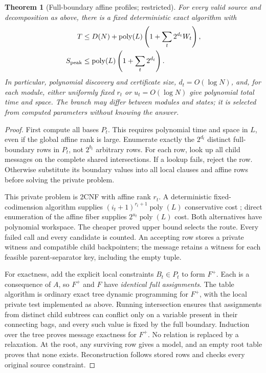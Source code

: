\documentclass[11pt]{article}
\newtheorem{theorem}{Theorem}
\newcommand{\poly}{\operatorname{poly}}
\begin{document}
\begin{theorem}[Full-boundary affine profiles; restricted]
For every valid source and decomposition as above, there is a fixed deterministic exact algorithm with
\begin{align*}
 T&\le D(N)+\poly(L)\left(1+\sum_t2^{d_t}W_t\right),\\
 S_{\rm peak}&\le\poly(L)\left(1+\sum_t2^{d_t}\right).
\end{align*}
In particular, polynomial discovery and certificate size, $d_t=O(\log N)$, and, for each module, either uniformly fixed $r_t$ or $u_t=O(\log N)$ give polynomial total time and space. The branch may differ between modules and states; it is selected from computed parameters without knowing the answer.
\end{theorem}
\begin{proof}
First compute all bases $P_t$. This requires polynomial time and space in $L$, even if the global affine rank is large. Enumerate exactly the $2^{d_t}$ distinct full-boundary rows in $P_t$, not $2^{b_t}$ arbitrary rows. For each row, look up all child messages on the complete shared intersections. If a lookup fails, reject the row. Otherwise substitute its boundary values into all local clauses and affine rows before solving the private problem.

This private problem is 2CNF with affine rank $r_t$. A deterministic fixed-codimension algorithm supplies $(i_t+1)^{r_t+1}\poly(L)$ conservative cost \cite{AG2021}; direct enumeration of the affine fiber supplies $2^{u_t}\poly(L)$ cost. Both alternatives have polynomial workspace. The cheaper proved upper bound selects the route. Every failed call and every candidate is counted. An accepting row stores a private witness and compatible child backpointers; the message retains a witness for each feasible parent-separator key, including the empty tuple.

For exactness, add the explicit local constraints $B_t\in P_t$ to form $F^+$. Each is a consequence of $A$, so $F^+$ and $F$ have \emph{identical full assignments}. The table algorithm is ordinary exact tree dynamic programming for $F^+$, with the local private test implemented as above. Running intersection ensures that assignments from distinct child subtrees can conflict only on a variable present in their connecting bags, and every such value is fixed by the full boundary. Induction over the tree proves message exactness for $F^+$. No relation is replaced by a relaxation. At the root, any surviving row gives a model, and an empty root table proves that none exists. Reconstruction follows stored rows and checks every original source constraint.


\end{proof}
\end{document}
